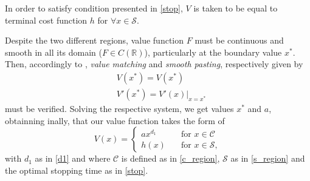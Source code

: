 In order to satisfy condition presented in \eqref{stop}, $V$ is taken to be equal to terminal cost function $h$ for $\forall x \in \mathcal{S}$.

Despite the two different regions, value function $F$ must be continuous and smooth in all its domain ($F\in C(\mathds{R})$), particularly at the boundary value $x^*$. Then, accordingly to \cite{dixit:book}, \textit{value matching} and \textit{smooth pasting}, respectively given by
\begin{subequations}
	\label{eq:vm+sp}
	\begin{align}
	&V(x^*)=V(x^*) \label{valuematch}\\
	&V'(x^*)=V'(x)|_{x=x^*} \label{smoothpasting}
	\end{align}
\end{subequations}
must be verified. Solving the respective system, we get values $x^*$ and $a$, obtainning inally, that our value function takes the form of
\begin{equation}
V(x)=\begin{cases} ax^{d_1} &\quad \text{for } x\in \mathcal{C} \\
h(x)  &\quad \text{for } x\in \mathcal{S},
\end{cases}
\label{sol}
\end{equation}
with $d_1$ as in \eqref{d1} and where $\mathcal{C}$ is defined as in \eqref{c_region}, $\mathcal{S}$ as in \eqref{s_region} and the optimal stopping time as in \eqref{stop}.







